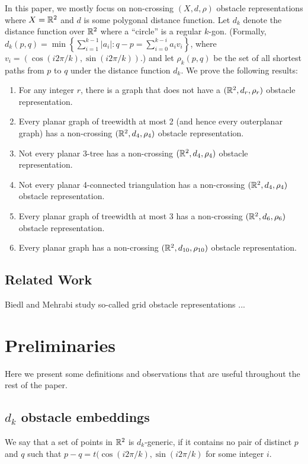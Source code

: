 \documentclass{patmorin}
\begin{document}
In this paper, we mostly focus on non-crossing $(X,d,\rho)$
obstacle representations where $X=\mathbb{R}^2$ and $d$ is some
polygonal distance function.  Let $d_k$ denote the distance
function over $\mathbb{R}^2$ where a ``circle'' is a regular $k$-gon.
(Formally, $d_k(p,q)=\min\left\{\sum_{i=1}^{k-1}|a_i|:
q-p=\sum_{i=0}^{k-i}a_iv_i\right\}$, where $v_i=(\cos(i2\pi/k),
\sin(i2\pi/k))$.)  and let $\rho_k(p,q)$ be the set of all shortest
paths from $p$ to $q$ under the distance function $d_k$.  We prove the
following results:
\begin{enumerate}
   \item For any integer $r$, there is a graph that does not have a
     $(\mathbb{R}^2,d_r,\rho_r)$ obstacle representation.
   \item Every planar graph of treewidth at most 2 (and hence every
     outerplanar graph) has a
     non-crossing $(\mathbb{R}^2,d_4,\rho_4)$ obstacle representation.
   \item Not every planar 3-tree has a 
     non-crossing $(\mathbb{R}^2,d_4,\rho_4)$ obstacle representation.
   \item Not every planar 4-connected triangulation has a 
     non-crossing $(\mathbb{R}^2,d_4,\rho_4)$ obstacle representation.
   \item Every planar graph of treewidth at most 3 has a 
     non-crossing $(\mathbb{R}^2,d_6,\rho_6)$ obstacle representation.
   \item Every planar graph has a non-crossing
     $(\mathbb{R}^2,d_{10},\rho_{10})$ obstacle representation.
\end{enumerate}

\subsection{Related Work}

Biedl and Mehrabi study so-called grid obstacle representations \cite{X}...

\section{Preliminaries}

Here we present some definitions and observations that are useful
throughout the rest of the paper.  

\subsection{$d_k$ obstacle embeddings}

We say that a set of points in $\mathbb{R}^2$ is $d_k$-generic, if it
contains no pair of distinct $p$ and $q$ such that $p-q=
t(\cos(i2\pi/k),\sin(i2\pi/k)$ for some integer $i$.
\end{document}
